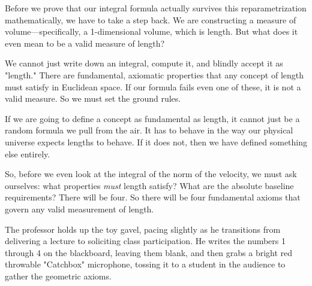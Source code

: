 \begin{spoken-clean}[00:09:30 - 00:11:00]
Before we prove that our integral formula actually survives this reparametrization mathematically, we have to take a step back. We are constructing a measure of volume—specifically, a 1-dimensional volume, which is length. But what does it even mean to be a valid measure of length? 

We cannot just write down an integral, compute it, and blindly accept it as "length." There are fundamental, axiomatic properties that any concept of length must satisfy in Euclidean space. If our formula fails even one of these, it is not a valid measure. So we must set the ground rules.
\end{spoken-clean}





\begin{spoken-clean}[00:11:00 - 00:12:30]
If we are going to define a concept as fundamental as length, it cannot just be a random formula we pull from the air. It has to behave in the way our physical universe expects lengths to behave. If it does not, then we have defined something else entirely. 

So, before we even look at the integral of the norm of the velocity, we must ask ourselves: what properties \textit{must} length satisfy? What are the absolute baseline requirements? There will be four. So there will be four fundamental axioms that govern any valid measurement of length.
\end{spoken-clean}

\begin{nice-box}
The professor holds up the toy gavel, pacing slightly as he transitions from delivering a lecture to soliciting class participation. He writes the numbers 1 through 4 on the blackboard, leaving them blank, and then grabs a bright red throwable "Catchbox" microphone, tossing it to a student in the audience to gather the geometric axioms.
\end{nice-box}

